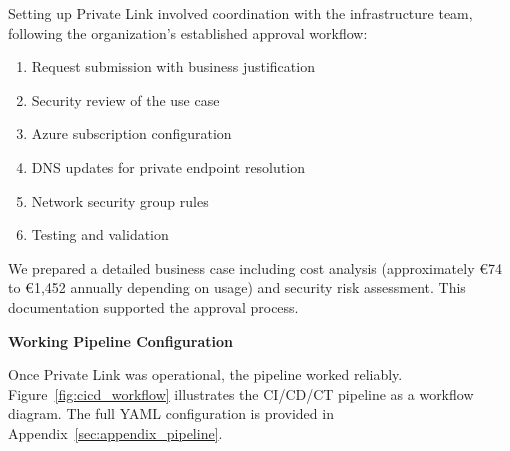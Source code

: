 Setting up Private Link involved coordination with the infrastructure team, following the organization's established approval workflow:

\begin{enumerate}
    \item Request submission with business justification
    \item Security review of the use case
    \item Azure subscription configuration
    \item DNS updates for private endpoint resolution
    \item Network security group rules
    \item Testing and validation
\end{enumerate}

We prepared a detailed business case including cost analysis (approximately \euro{}74 to \euro{}1,452 annually depending on usage) and security risk assessment. This documentation supported the approval process.

\textbf{Working Pipeline Configuration}

Once Private Link was operational, the pipeline worked reliably. Figure~\ref{fig:cicd_workflow} illustrates the CI/CD/CT pipeline as a workflow diagram. The full YAML configuration is provided in Appendix~\ref{sec:appendix_pipeline}.

